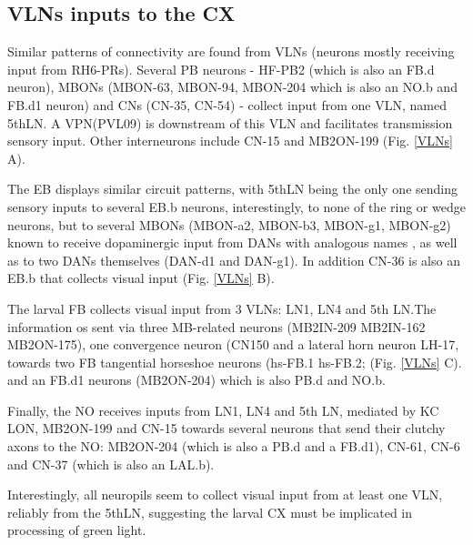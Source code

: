     \subsection{VLNs inputs to the CX}
    Similar patterns of connectivity are found from VLNs (neurons mostly receiving input from RH6-PRs). 
    Several PB neurons -  HF-PB2 (which is also an FB.d neuron), MBONs (MBON-63, MBON-94, MBON-204 which is also an NO.b and FB.d1 neuron) and CNs (CN-35, CN-54) - collect input from one VLN, named 5thLN. A VPN(PVL09) is downstream of this VLN and facilitates transmission sensory input.  Other interneurons include CN-15 and MB2ON-199 (Fig. \ref{VLNs} A).

    The EB displays similar circuit patterns, with 5thLN being the only one sending sensory inputs to several EB.b neurons, interestingly, to none of the ring or wedge neurons, but to several MBONs (MBON-a2, MBON-b3, MBON-g1, MBON-g2) known to receive dopaminergic input from DANs with analogous names \citep{eschbach2020recurrent}, as well as to two DANs themselves (DAN-d1 and DAN-g1). In addition CN-36 is also an EB.b that collects visual input (Fig. \ref{VLNs} B).

    The larval FB collects visual input from 3 VLNs: LN1, LN4 and 5th LN.The information os sent via three MB-related neurons (MB2IN-209 MB2IN-162 MB2ON-175), one convergence neuron (CN150 and a lateral horn neuron LH-17, towards two FB tangential horseshoe neurons (hs-FB.1 hs-FB.2; (Fig. \ref{VLNs} C). and an FB.d1 neurons (MB2ON-204) which is also PB.d and NO.b.

    Finally, the NO receives inputs from LN1, LN4 and 5th LN, mediated by KC LON, MB2ON-199 and CN-15 towards several neurons that send their clutchy axons to the NO:  MB2ON-204 (which is also a PB.d and a FB.d1), CN-61, CN-6 and CN-37 (which is also an LAL.b). 

    Interestingly, all neuropils seem to collect visual input from at least one VLN, reliably from the 5thLN, suggesting the larval CX must be implicated in processing of green light. 



